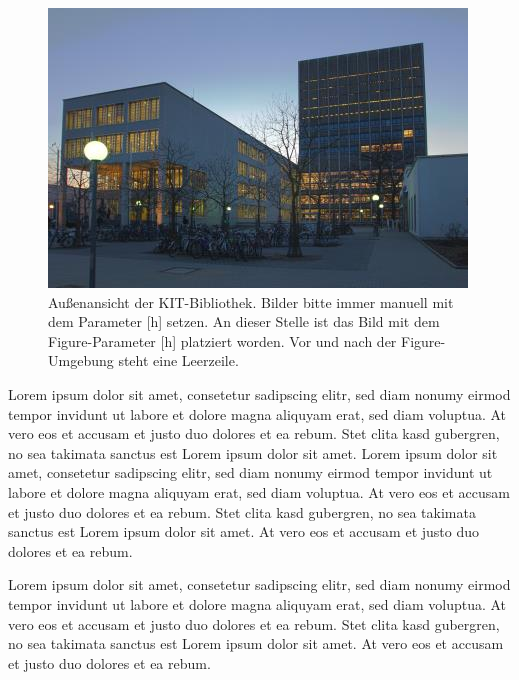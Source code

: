 \begin{figure}[h] %
	\centering
	\includegraphics[width=\textwidth]{Abbildungen/bib.jpg}
	\caption{Außenansicht der KIT-Bibliothek. Bilder bitte immer manuell mit dem Parameter [h] setzen.	An dieser Stelle ist das Bild mit dem Figure-Parameter [h] platziert worden. Vor und nach der Figure-Umgebung steht eine Leerzeile.}
	\label{fig:bib}
\end{figure}

Lorem ipsum dolor sit amet, consetetur sadipscing elitr, sed diam nonumy eirmod tempor invidunt ut labore et dolore magna aliquyam erat, sed diam voluptua. At vero eos et accusam et justo duo dolores et ea rebum. Stet clita kasd gubergren, no sea takimata sanctus est Lorem ipsum dolor sit amet. Lorem ipsum dolor sit amet, consetetur sadipscing elitr, sed diam nonumy eirmod tempor invidunt ut labore et dolore magna aliquyam erat, sed diam voluptua. At vero eos et accusam et justo duo dolores et ea rebum. Stet clita kasd gubergren, no sea takimata sanctus est Lorem ipsum dolor sit amet. At vero eos et accusam et justo duo dolores et ea rebum.

Lorem ipsum dolor sit amet, consetetur sadipscing elitr, sed diam nonumy eirmod tempor invidunt ut labore et dolore magna aliquyam erat, sed diam voluptua. At vero eos et accusam et justo duo dolores et ea rebum. Stet clita kasd gubergren, no sea takimata sanctus est Lorem ipsum dolor sit amet. At vero eos et accusam et justo duo dolores et ea rebum.	

